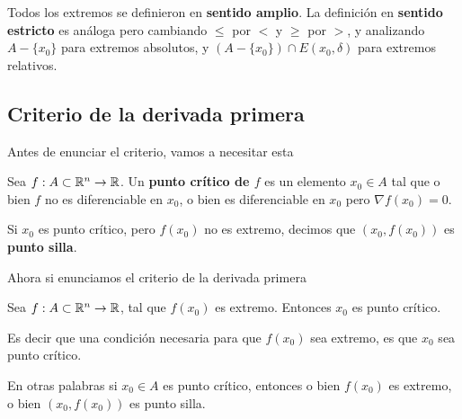 \begin{observation}
Todos los extremos se definieron en \textbf{sentido amplio}. La definición en \textbf{sentido estricto} es análoga pero cambiando $\leq$ por $<$ y $\geq$ por $>$, y analizando $A - \{x_0\}$ para extremos absolutos, y $( A - \{x_0\} ) \cap E(x_0, \delta)$ para extremos relativos.
\end{observation}

\subsection{Criterio de la derivada primera}

Antes de enunciar el criterio, vamos a necesitar esta

\begin{definition} \label{punto_critico_silla}
Sea $f : A \subset \mathbb{R}^n \to \mathbb{R}$.  Un \textbf{punto crítico de $f$}  es un elemento $x_0 \in A$ tal que o bien $f$ no es diferenciable en $x_0$, o bien es diferenciable en $x_0$ pero $ \nabla f(x_0) = 0$.

Si $x_0$ es punto crítico, pero $f(x_0)$ no es extremo, decimos que $(x_0, f(x_0))$ es \textbf{punto silla}. 
\end{definition}

Ahora si enunciamos el criterio de la derivada primera

\begin{theorem} \label{criterio_derivada_primera} 
Sea $f : A \subset \mathbb{R}^n \to \mathbb{R}$, tal que $f(x_0)$ es extremo.  Entonces $x_0$ es punto crítico.

Es decir que una condición necesaria para que $f(x_0)$ sea extremo, es que $x_0$ sea punto crítico.
\end{theorem}

En otras palabras si $x_0 \in A$ es punto crítico, entonces o bien $f(x_0)$ es extremo, o bien $(x_0, f(x_0))$ es punto silla.

